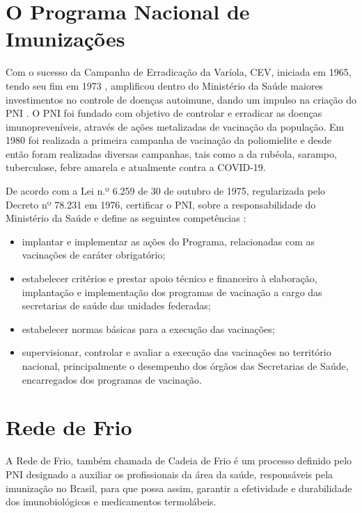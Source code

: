 \section{O Programa Nacional de Imunizações}
\label{intro:PNI}
Com o sucesso da Campanha de Erradicação da Varíola, CEV, iniciada em 1965, tendo seu fim em 1973 \cite{muniz2011memorias}, amplificou dentro do Ministério da Saúde maiores investimentos no controle de doenças autoimune, dando um impulso na criação do PNI \cite{temporao2003programa}. O PNI foi fundado com objetivo de controlar e erradicar as doenças imunopreveníveis, através de ações metalizadas de vacinação da população. Em 1980 foi realizada a primeira campanha de vacinação da poliomielite e desde então foram realizadas diversas campanhas, tais como a da rubéola, sarampo, tuberculose, febre amarela \cite{temporao2003programa, ministerio2001manual} e atualmente contra a COVID-19.

De acordo com a Lei n.º 6.259 de 30 de outubro de 1975, regularizada pelo Decreto nº 78.231 em 1976, certificar o PNI, sobre a responsabilidade do Ministério da Saúde e define as seguintes competências \cite{ministerio2001manual}:

  \begin{itemize}
    \item implantar e implementar as ações do Programa, relacionadas com as vacinações de caráter obrigatório;
    \item  estabelecer critérios e prestar apoio técnico e financeiro à elaboração, implantação e implementação dos programas de vacinação a cargo das secretarias de saúde das unidades federadas;
    \item estabelecer normas básicas para a execução das vacinações;
    \item supervisionar, controlar e avaliar a execução das vacinações no território nacional, principalmente o desempenho dos órgãos das Secretarias de Saúde, encarregados dos programas de vacinação.
  \end{itemize}

\section{Rede de Frio}
\label{intro:redes-de-frio}
A Rede de Frio, também chamada de Cadeia de Frio é um processo definido pelo PNI designado a auxiliar os profissionais da área da saúde, responsáveis pela imunização no Brasil, para que possa assim, garantir a efetividade e durabilidade dos imunobiológicos e medicamentos termolábeis.

